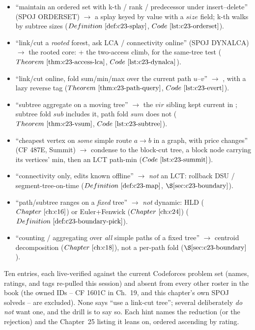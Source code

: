 \begin{itemize}[nosep, leftmargin=1.4em]
  \item ``maintain an ordered set with k-th / rank / predecessor under insert--delete'' (SPOJ ORDERSET)
        \(\to\) a splay keyed by value with a \(\mathit{size}\) field; k-th walks by subtree sizes
        (\(\defref{c23-splay}\), \(\coderef{c23-orderset}\)).
  \item ``link/cut a \emph{rooted} forest, ask LCA / connectivity online'' (SPOJ DYNALCA) \(\to\) the
        rooted core:  + the two-access climb,  for the same-tree test
        (\(\thmref{c23-access-lca}\), \(\coderef{c23-dynalca}\)).
  \item ``link/cut online, fold sum/min/max over the current path \(u\)--\(v\)'' \(\to\)
        , with a lazy reverse tag (\(\thmref{c23-path-query}\),
        \(\coderef{c23-evert}\)).
  \item ``subtree aggregate on a moving tree'' \(\to\) the \(\mathit{vir}\) sibling kept current in
        ; subtree fold \(\mathit{sub}\) includes it, path fold \(\mathit{sum}\) does not
        (\(\thmref{c23-vsum}\), \(\coderef{c23-subtree}\)).
  \item ``cheapest vertex on \emph{some} simple route \(a\to b\) in a graph, with price changes''
        (CF 487E, Summit) \(\to\) condense to the block-cut tree, a block node carrying its
        vertices' min, then an LCT path-min (\(\coderef{c23-summit}\)).
  \item ``connectivity only, edits known offline'' \(\to\) \emph{not} an LCT: rollback DSU /
        segment-tree-on-time (\(\defref{c23-map}\), \(\secref{c23-boundary}\)).
  \item ``path/subtree ranges on a \emph{fixed} tree'' \(\to\) \emph{not} dynamic: HLD (\(\chref{c16}\))
        or Euler+Fenwick (\(\chref{c24}\)) (\(\defref{c23-boundary-pick}\)).
  \item ``counting / aggregating over \emph{all} simple paths of a fixed tree'' \(\to\) centroid
        decomposition (\(\chref{c18}\)), not a per-path fold (\(\secref{c23-boundary}\)).
\end{itemize}


Ten entries, each live-verified against the current Codeforces problem set (names, ratings, and tags
re-pulled this session) and absent from every other roster in the book (the owned IDs -- CF 1601C in
Ch.~19, and this chapter's own SPOJ solveds -- are excluded). None says ``use a link-cut tree'';
several deliberately \emph{do not} want one, and the drill is to say so. Each hint names the
reduction (or the rejection) and the Chapter~25 listing it leans on, ordered ascending by rating.

